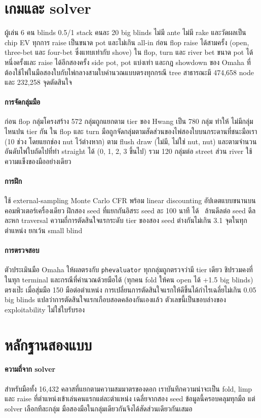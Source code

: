 \documentclass[11pt]{article}
\begin{document}
\section{เกมและ solver}
ผู้เล่น 6 คน blinds 0.5/1 stack คนละ 20 big blinds ไม่มี ante ไม่มี rake และวัดผลเป็น chip EV ทุกการ raise
เป็นขนาด pot และไม่เกิน all-in ก่อน flop raise ได้สามครั้ง (open, three-bet และ four-bet ซึ่งแทบเท่ากับ shove)
ใน flop, turn และ river bet ขนาด pot ได้หนึ่งครั้งและ raise ได้อีกสองครั้ง side pot, pot แบ่งเท่า และกฎ showdown
ของ Omaha ที่ต้องใช้ไพ่ในมือสองใบกับไพ่กลางสามใบคำนวณแบบตรงทุกกรณี tree สาธารณะมี 474{,}658 node และ
232{,}258 จุดตัดสินใจ

\paragraph{การจัดกลุ่มมือ} ก่อน flop กลุ่มโครงสร้าง 572 กลุ่มถูกแยกตาม tier ของ Hwang เป็น 780 กลุ่ม ทำให้
ไม่มีกลุ่มไหนปน tier กัน ใน flop และ turn มือถูกจัดกลุ่มตามสัดส่วนของไพ่สองใบบนกระดานที่ชนะมือเรา (10 ช่วง
โดยแยกช่อง nut ไว้ต่างหาก) ตาม flush draw (ไม่มี, ไม่ใช่ nut, nut) และตามจำนวนอันดับไพ่ใบถัดไปที่ทำ straight ได้
(0, 1, 2, 3 ขึ้นไป) รวม 120 กลุ่มต่อ street ส่วน river ใช้ความแข็งของมืออย่างเดียว

\paragraph{การฝึก} ใช้ external-sampling Monte Carlo CFR พร้อม linear discounting อัปเดตแบบขนานบนคอมพิวเตอร์เครื่องเดียว
ฝึกสอง seed ที่แยกกันอิสระ seed ละ 100 นาที ได้ \Deals\ ล้านดีลต่อ seed ดีลละหก traversal
ความถี่การตัดสินใจแรกระดับ tier ของสอง seed ต่างกันไม่เกิน 3.1 จุดในทุกตำแหน่ง ยกเว้น small blind

\paragraph{การตรวจสอบ} ตัวประเมินมือ Omaha ให้ผลตรงกับ \texttt{phevaluator} ทุกกลุ่มถูกตรวจว่ามี tier เดียว
ชิปรวมคงที่ในทุก terminal และกรณีที่คำนวณด้วยมือได้ (ทุกคน fold ให้คน open ได้ +1.5 big blinds) ตรงเป๊ะ
เมื่อสุ่มมือ 150 มือต่อตำแหน่ง การเปลี่ยนการตัดสินใจแรกให้ดีขึ้นได้กำไรเฉลี่ยไม่เกิน 0.05 big blinds
แปลว่าการตัดสินใจแรกเกือบสอดคล้องกันเองแล้ว ตัวเลขนี้เป็นขอบล่างของ exploitability ไม่ใช่ใบรับรอง

\section{หลักฐานสองแบบ}
\paragraph{ความถี่จาก solver} สำหรับมือทั้ง 16{,}432 คลาสที่แยกตามความสมมาตรของดอก เราบันทึกความน่าจะเป็น
fold, limp และ raise ที่ตำแหน่งเข้าเล่นคนแรกแต่ละตำแหน่ง เฉลี่ยจากสอง seed ข้อมูลนี้ครอบคลุมทุกมือ แต่ solver
เลือกทีละกลุ่ม มือสองมือในกลุ่มเดียวกันจึงได้สัดส่วนเดียวกันเสมอ
\end{document}
